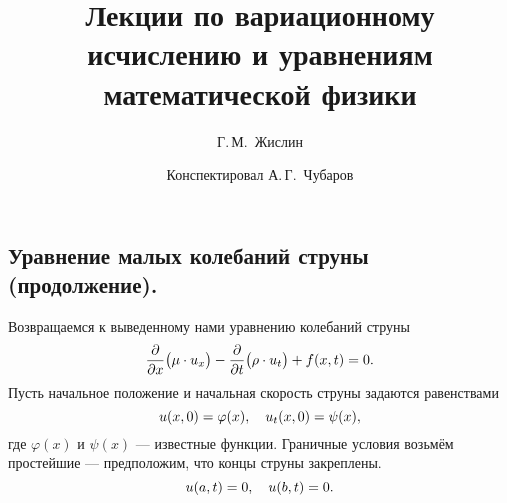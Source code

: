 \documentclass[12pt,a4paper,openany,fleqn]{book}
\newcommand{\pder}[2]{\ensuremath{\frac{\partial#1}{\partial#2}}}
\theoremstyle{definition}
\begin{document}
	\author{Г.\,М.~Жислин}
	\title{Лекции по вариационному исчислению и уравнениям математической физики}
	\date{Конспектировал А.\,Г.~Чубаров}
	
	
	
	\maketitle
	
	
	\renewcommand{\thepart}{\Asbuk{part}}
	\renewcommand{\thechapter}{\arabic{chapter}}
	\renewcommand{\thesection}{\arabic{section}}
	\renewcommand{\thesubsection}{\Roman{subsection}}
	\renewcommand{\thefootnote}{\roman{footnote}}
	\renewcommand{\phi}{\varphi}
	
	\setcounter{chapter}{11}
	\chapter{}
	\label{lecture12}
	\section{Уравнение малых колебаний струны (продолжение).}
	\label{lecture12section1}
	Возвращаемся к выведенному нами уравнению колебаний струны
	\begin{equation}
		\label{l12:eq:1}
		\hfill\pder{}{x}\big(\mu\cdot u_x\big)-\pder{}{t}\big(\rho\cdot u_t\big)+f(x,t)=0.\hfill
	\end{equation}
	Пусть начальное положение и начальная скорость струны задаются равенствами 
	\begin{equation}
		\label{l12:eq:2}
		\hfill u(x,0)=\phi(x),\quad u_t(x,0)=\psi(x),\hfill
	\end{equation} 
	где $\phi(x)$ и $\psi(x)$ --- известные функции. Граничные условия возьмём простейшие --- предположим, что концы струны закреплены.
	\begin{equation}
		\label{l12:eq:3}
		\hfill u(a,t)=0,\quad u(b,t)=0.\hfill
	\end{equation}
\end{document}
